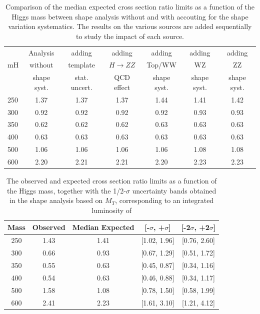 \begin{table}[!ht]
\begin{center}
{\normalsize
\begin{tabular}{|l|c|ccccc|}
\hline
      &  Analysis    & adding          &  adding      &  adding      & adding      & adding \\
mH  &  without     & template        &  $H\to ZZ$   &  Top/WW             & WZ          & ZZ \\
      &  shape syst. & stat. uncert.   &  QCD effect &  shape syst. & shape syst. & shape syst. \\
\hline
250 & 1.37 & 1.37 & 1.37 & 1.44 & 1.41 & 1.42 \\   
300 & 0.92 & 0.92 & 0.92 & 0.92 & 0.93 & 0.93 \\ 
350 & 0.62 & 0.62 & 0.62 & 0.63 & 0.63 & 0.63 \\
400 & 0.63 & 0.63 & 0.63 & 0.63 & 0.63 & 0.63 \\
500 & 1.06 & 1.06 & 1.06 & 1.06 & 1.08 & 1.08 \\
600 & 2.20 & 2.21 & 2.21 & 2.20 & 2.23 & 2.23 \\
\hline
\end{tabular}
}
\caption{Comparison of the median expected cross section ratio limits as a function 
of the Higgs mass between shape analysis without and with accouting for the 
shape variation systematics. The results on the various sources are added sequentially 
to study the impact of each source. } %
\label{tab:mva_mtshape_detail}
\end{center}
\end{table}
\begin{table}[!ht]
\begin{center}
\begin{tabular}{ccccc}
\hline\hline
Mass & Observed & Median Expected & [-$\sigma$, +$\sigma$] & [-2$\sigma$, +2$\sigma$]\\\hline
250 & 1.43 & 1.41 & [1.02, 1.96] & [0.76, 2.60] \\
300 & 0.66 & 0.93 & [0.67, 1.29] & [0.51, 1.72] \\
350 & 0.55 & 0.63 & [0.45, 0.87] & [0.34, 1.16] \\
400 & 0.54 & 0.63 & [0.46, 0.88] & [0.34, 1.17] \\
500 & 1.58 & 1.08 & [0.78, 1.50] & [0.58, 1.99] \\
600 & 2.41 & 2.23 & [1.61, 3.10] & [1.21, 4.12] \\
\hline\hline
\end{tabular}
\end{center}
\caption{The observed and expected cross section ratio limits as a function 
of the Higgs mass, together with the 1/2-$\sigma$ uncertainty bands obtained in the shape analysis based on $M_T$, 
corresponding to an integrated luminosity of \intlumi}
\label{tab:limits_mtshape_5fb}
\end{table}
